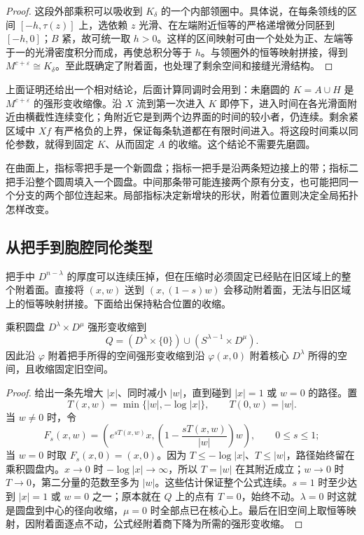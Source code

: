 \begin{proof}
	这段外部乘积可以吸收到 \(K_\delta\) 的一个内部领圈中。具体说，在每条领线的区间 \([-h,\tau(z)]\) 上，选依赖 \(z\) 光滑、在左端附近恒等的严格递增微分同胚到 \([-h,0]\)；\(B\) 紧，故可统一取 \(h>0\)。这样的区间映射可由一个处处为正、左端等于一的光滑密度积分而成，再使总积分等于 \(h\)。与领圈外的恒等映射拼接，得到 \(M^{c+\varepsilon}\cong K_\delta\)。至此既确定了附着面，也处理了剩余空间和接缝光滑结构。
\end{proof}

上面证明还给出一个相对结论，后面计算同调时会用到：未磨圆的 \(K=A\cup H\) 是 \(M^{c+\varepsilon}\) 的强形变收缩像。沿 \(X\) 流到第一次进入 \(K\) 即停下，进入时间在各光滑面附近由横截性连续变化；角附近它是到两个边界面的时间的较小者，仍连续。剩余紧区域中 \(Xf\) 有严格负的上界，保证每条轨道都在有限时间进入。将这段时间乘以同伦参数，就得到固定 \(K\)、从而固定 \(A\) 的收缩。这个结论不需要先磨圆。

\ProseParagraphBreak

在曲面上，指标零把手是一个新圆盘；指标一把手是沿两条短边接上的带；指标二把手沿整个圆周填入一个圆盘。中间那条带可能连接两个原有分支，也可能把同一个分支的两个部位连起来。局部指标决定新增块的形状，附着位置则决定全局拓扑怎样改变。

\subsection{从把手到胞腔同伦类型}
\label{g2:subsec:1702:04}
把手中 \(D^{n-\lambda}\) 的厚度可以连续压掉，但在压缩时必须固定已经贴在旧区域上的整个附着面。直接将 \((x,w)\) 送到 \((x,(1-s)w)\) 会移动附着面，无法与旧区域上的恒等映射拼接。下面给出保持粘合位置的收缩。

\begin{lemma}\label{g2:lem:handle-core-retraction}
	乘积圆盘 \(D^\lambda\times D^\mu\) 强形变收缩到
	\[
		Q=(D^\lambda\times\{0\})\cup(S^{\lambda-1}\times D^\mu).
	\]
	因此沿 \(\varphi\) 附着把手所得的空间强形变收缩到沿 \(\varphi(x,0)\) 附着核心 \(D^\lambda\) 所得的空间，且收缩固定旧空间。
\end{lemma}
\begin{proof}
	给出一条先增大 \(|x|\)、同时减小 \(|w|\)，直到碰到 \(|x|=1\) 或 \(w=0\) 的路径。置
	\[
		T(x,w)=\min\{|w|,-\log|x|\},\qquad
		T(0,w)=|w|.
	\]
	当 \(w\ne0\) 时，令
	\[
		F_s(x,w)=\left(e^{sT(x,w)}x,
		\left(1-\frac{sT(x,w)}{|w|}\right)w\right),
		\qquad 0\le s\le1;
	\]
	当 \(w=0\) 时取 \(F_s(x,0)=(x,0)\)。因为 \(T\le-\log|x|\)、\(T\le|w|\)，路径始终留在乘积圆盘内。\(x\to0\) 时 \(-\log|x|\to\infty\)，所以 \(T=|w|\) 在其附近成立；\(w\to0\) 时 \(T\to0\)，第二分量的范数至多为 \(|w|\)。这些估计保证整个公式连续。\(s=1\) 时至少达到 \(|x|=1\) 或 \(w=0\) 之一；原本就在 \(Q\) 上的点有 \(T=0\)，始终不动。\(\lambda=0\) 时这就是圆盘到中心的径向收缩，\(\mu=0\) 时全部点已在核心上。最后在旧空间上取恒等映射，因附着面逐点不动，公式经附着商下降为所需的强形变收缩。
\end{proof}

